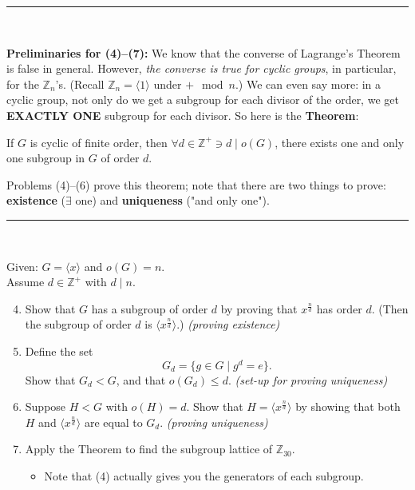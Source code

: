 \noindent \rule{\textwidth}{0.4pt} \\ \steezybreak

\noindent \textbf{Preliminaries for (4)--(7):}  
We know that the converse of Lagrange's Theorem is false in general. However, \textit{the converse is true for cyclic groups}, in particular, for the \( \mathbb{Z}_n \)'s.  
(Recall \( \mathbb{Z}_n = \langle 1 \rangle \) under \( + \mod n \).)  
We can even say more: in a cyclic group, not only do we get a subgroup for each divisor of the order, we get \textbf{EXACTLY ONE} subgroup for each divisor. So here is the \textbf{Theorem}:  
\begin{theorem*}
    If $G$ is cyclic  of finite order, then \(\forall d \in \mathbb{Z}^+ \ni  d \mid o(G)\), there exists one and only one subgroup in $G$ of order $d$.
\end{theorem*}
\noindent Problems (4)--(6) prove this theorem; note that there are two things to prove: \textbf{existence} (\(\exists\) one) and \textbf{uniqueness} ("and only one"). \\ \steezybreak

\noindent \rule{\textwidth}{0.4pt} \\ \steezybreak

\noindent Given: \( G = \langle x \rangle \) and \( o(G) = n \).  \\
\noindent Assume \( d \in \mathbb{Z}^+ \) with \( d \mid n \). \\

\begin{enumerate}
    \setcounter{enumi}{3} %
    \item Show that \( G \) has a subgroup of order \( d \) by proving that \( x^{\frac{n}{d}} \) has order \( d \).  
    (Then the subgroup of order \( d \) is \( \langle x^{\frac{n}{d}} \rangle \).)  
    \mbox{}\hfill \textit{(proving existence)} \\ \steezybreak
    
    \item Define the set 
    \[
    G_d = \{ g \in G \mid g^d = e \}.
    \]
    Show that \( G_d < G \), and that \( o(G_d) \leq d \).  
    \mbox{}\hfill \textit{(set-up for proving uniqueness)} \\ \steezybreak
    
    \item Suppose \( H < G \) with \( o(H) = d \).  
    Show that \( H = \langle x^{\frac{n}{d}} \rangle \)  
    by showing that both \( H \) and \( \langle x^{\frac{n}{d}} \rangle \) are equal to \( G_d \).  
    \mbox{}\hfill \textit{(proving uniqueness)} \\ \steezybreak
    
    \item Apply the Theorem to find the subgroup lattice of \( \mathbb{Z}_{30} \).  
    \begin{itemize}
        \item Note that (4) actually gives you the generators of each subgroup.
    \end{itemize}
\end{enumerate}
\newpage 

